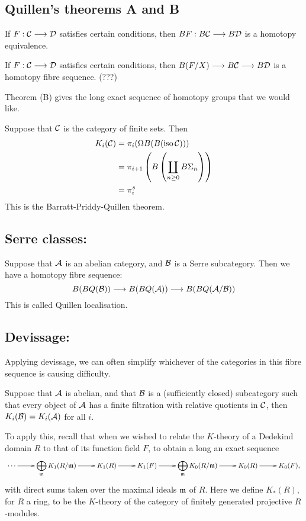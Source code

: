 \begin{InnaKTheory}
\subsection*{Quillen's theorems A and B}
\begin{thm*}[A]
If $F:\mathcal{C}\longrightarrow\mathcal{D}$ satisfies certain conditions, then $BF:B\mathcal{C}\longrightarrow B\mathcal{D}$ is a homotopy equivalence.
\end{thm*}
\begin{thm*}[B]
If $F:\mathcal{C}\longrightarrow\mathcal{D}$ satisfies certain conditions, then $B(F/X)\longrightarrow B\mathcal{C}\longrightarrow B\mathcal{D}$ is a homotopy fibre sequence. (???)
\end{thm*}
Theorem (B) gives the long exact sequence of homotopy groups that we would like.

\begin{exmp*}
Suppose that $\mathcal{C}$ is the category of finite sets. Then
\begin{alignat*}{2}
K_i(\calC)&=\pi_i(\Omega B(B(\textup{iso}\,\calC)))%
\\&=\pi_{i+1}\left(B\left(\coprod_{n\geq0}B\Sigma_n\right)\right)%
\\&=\pi_i^s%
\end{alignat*}
This is the Barratt-Priddy-Quillen theorem.
\end{exmp*}
\subsection*{Serre classes:}
Suppose that $\mathcal{A}$ is an abelian category, and $\mathcal{B}$ is a Serre subcategory. Then we have a homotopy fibre sequence:
\[B(BQ(\mathcal{B}))\longrightarrow B(BQ(\mathcal{A}))\longrightarrow B(BQ(\mathcal{A}/\mathcal{B}))\]
This is called Quillen localisation.
\subsection*{Devissage:}
Applying devissage, we can often simplify whichever of the categories in this fibre sequence is causing difficulty.
\begin{thm*}[Devissage]
Suppose that $\mathcal{A}$ is abelian, and that $\mathcal{B}$ is a (sufficiently closed) subcategory such that every object of $\mathcal{A}$ has a finite filtration with relative quotients in $\mathcal{C}$, then $K_i(\mathcal{B})=K_i(\mathcal{A})$ for all $i$.
\end{thm*}
To apply this, recall that when we wished to relate the $K$-theory of 
a Dedekind domain $R$ to that of its function field $F$, to obtain a long an exact sequence
\[\xymatrix{
\cdots\ar[r]&\displaystyle\bigoplus_{\frakm}K_1(R/\frakm)\ar[r]&
K_1(R)\ar[r]&
K_1(F)\ar[r]&
\displaystyle\bigoplus_{\frakm}K_0(R/\frakm)\ar[r]&
K_0(R)\ar[r]&
K_0(F),}\]
with direct sums taken over the maximal ideals $\mathfrak{m}$ of $R$. Here we define $K_*(R)$, for $R$ a ring, to be the $K$-theory of the category of finitely generated projective $R$-modules.


\end{InnaKTheory}
